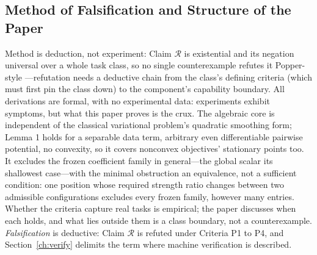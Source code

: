 \subsection{Method of Falsification and Structure of the Paper}

Method is deduction, not experiment: Claim $\mathcal{R}$ is existential and its negation universal over a whole task class, so no single counterexample refutes it Popper-style \citep{popper1959}---refutation needs a deductive chain from the class's defining criteria (which must first pin the class down) to the component's capability boundary. All derivations are formal, with no experimental data: experiments exhibit symptoms, but what this paper proves is the crux. The algebraic core is independent of the classical variational problem's quadratic smoothing form; Lemma 1 holds for a separable data term, arbitrary even differentiable pairwise potential, no convexity, so it covers nonconvex objectives' stationary points too. It excludes the frozen coefficient family in general---the global scalar its shallowest case---with the minimal obstruction an equivalence, not a sufficient condition: one position whose required strength ratio changes between two admissible configurations excludes every frozen family, however many entries. Whether the criteria capture real tasks is empirical; the paper discusses when each holds, and what lies outside them is a class boundary, not a counterexample. \emph{Falsification} is deductive: Claim $\mathcal{R}$ is refuted under Criteria P1 to P4, and Section~\ref{ch:verify} delimits the term where machine verification is described.
